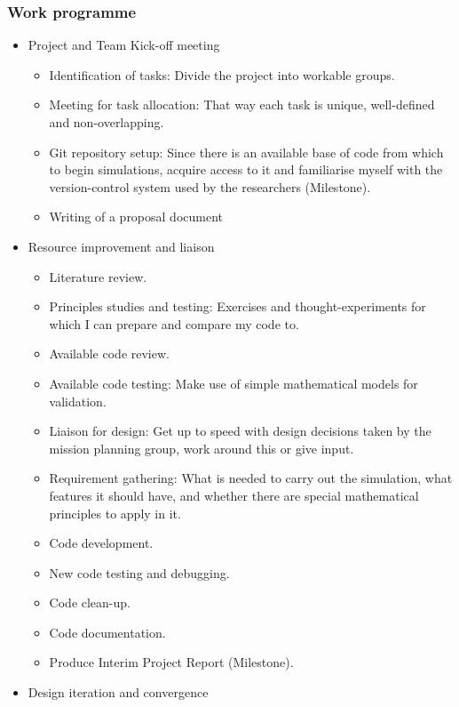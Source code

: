 \subsubsection{Work programme}
\begin{itemize}
\item Project and Team Kick-off meeting
    \begin{itemize}
        \item Identification of tasks: Divide the project into workable groups.
        \item Meeting for task allocation: That way each task is unique, well-defined and non-overlapping.
        \item Git repository setup: Since there is an available base of code from which to begin simulations, acquire access to it and familiarise myself with the version-control system used by the researchers (Milestone).
        \item Writing of a proposal document
    \end{itemize}
\item Resource improvement and liaison
    \begin{itemize}
        \item Literature review.
        \item Principles studies and testing: Exercises and thought-experiments for which I can prepare and compare my code to.
        \item Available code review.
        \item Available code testing: Make use of simple mathematical models for validation.
        \item Liaison for design: Get up to speed with design decisions taken by the mission planning group, work around this or give input.
        \item Requirement gathering: What is needed to carry out the simulation, what features it should have, and whether there are special mathematical principles to apply in it.
        \item Code development.
        \item New code testing and debugging.
        \item Code clean-up.
        \item Code documentation.
        \item Produce Interim Project Report (Milestone).
    \end{itemize}
\item Design iteration and convergence
    \begin{itemize}

\end{itemize}
\end{itemize}
